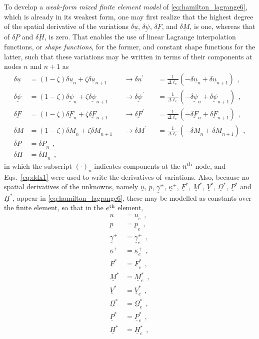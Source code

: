 \documentclass[12pt,a4paper,oneside,english]{abntex2} %
\newcommand{\vect}[1]{\underline{#1}}
\def\lp{\left(}
\def\rp{\right)}
\def\u{\vect{u}}
\def\uprime{\u^{\prime}}
\def\gam{\vect{\gamma}}
\def\gamp{\gam^{+}}
\def\kap{\vect{\kappa}}
\def\kapp{\kap^{+}}
\def\V{\vect{V}}
\def\Vs{\V^{*}}
\def\Om{\vect{\Omega}}
\def\Oms{\Om^{*}}
\def\P{\vect{P}}
\def\Ps{\P^*}
\def\Hv{\vect{H}}
\def\Hvs{\Hv^*}
\def\p{\vect{p}}
\def\F{\vect{F}}
\def\Fs{\F^*}
\def\M{\vect{M}}
\def\Ms{\M^*}
\def\delF{\vect{\delta F}}
\def\delFp{\delF^{\prime}}
\def\delM{\vect{\delta M}}
\def\delMp{\delM^{\prime}}
\def\delP{\vect{\delta P}}
\def\delH{\vect{\delta H}}
\def\delpsi{\vect{\delta\psi}}
\def\delpsip{\delpsi^{\prime}}
\def\Deltal{\Delta \ell_e}
\def\Deltalinv{\frac{1}{\Deltal}}
\def\ue{\u_e}
\def\pe{\p_e}
\def\Vse{\Vs_e}
\def\Omse{\Oms_e}
\def\gampe{\gamp_e}
\def\kappe{\kapp_e}
\def\Fse{\Fs_e}
\def\Mse{\Ms_e}
\def\Pse{\Ps_e}
\def\Hse{\Hvs_e}
\begin{document}
To develop a \textit{weak-form mixed finite element model} \cite{reddy2002energy} of \cref{eq:hamilton_lagrange6}, which is already in its weakest form, one may first realize that the highest degree of the spatial derivative of the variations $\delta\u$, $\delpsi$, $\delF$, and $\delM$, is one, whereas that of $\delP$ and $\delH$, is zero. That enables the use of linear Lagrange interpolation functions, or \textit{shape functions}, for the former, and constant shape functions for the latter, such that these variations may be written in terms of their components at nodes $n$ and $n+1$ as
\begin{equation}
    \begin{alignedat}{3}
        \delta\u &= \lp1-\zeta\rp\delta\u_{n} + \zeta\delta\u_{n+1} 
        &&\rightarrow 
        \delta\uprime &&= \Deltalinv\lp-\delta\u_n+\delta\u_{n+1}\rp \ \ ,
        \\
        \delpsi &= \lp1-\zeta\rp\delpsi_{n} +        \zeta\delpsi_{n+1} 
        &&\rightarrow 
        \delpsip &&= \Deltalinv\lp-\delpsi_n+\delpsi_{n+1}\rp \ \ ,
        \\
        \delF &= \lp1-\zeta\rp\delF_{n} +            \zeta\delF_{n+1} 
        &&\rightarrow 
        \delFp &&= \Deltalinv\lp-\delF_n+\delF_{n+1}\rp \ \ ,
        \\
        \delM &= \lp1-\zeta\rp\delM_{n} +            \zeta\delM_{n+1} 
        &&\rightarrow 
        \delMp &&= \Deltalinv\lp-\delM_n+\delM_{n+1}\rp \ \ ,
        \\
        \delP &= \delP_{n} \ \ ,
        \\
        \delH &= \delH_{n} \ \ ,
        \label{eq:delvars_n_np1}
    \end{alignedat}
\end{equation}
in which the subscript $\lp\cdot\rp_{n}$ indicates components at the $n^{\textnormal{th}}$ node, and Eqs.~\eqref{eq:ddx1} were used to write the derivatives of variations. Also, because no spatial derivatives of the unknowns, namely $\u$, $\p$, $\gamp$, $\kapp$, $\Fs$, $\Ms$, $\Vs$, $\Oms$, $\Ps$ and $\Hvs$, appear in \cref{eq:hamilton_lagrange6}, these may be modelled as constants over the finite element, so that in the $e^{\textnormal{th}}$ element,
\begin{equation}
    \begin{aligned}
        \u &= \ue \ \ , \\
        \p &= \pe \ \ , \\
        \gamp &= \gampe \ \ , \\
        \kapp &= \kappe \ \ , \\
        \Fs &= \Fse \ \ , \\
        \Ms &= \Mse \ \ , \\
        \Vs &= \Vse \ \ , \\
        \Oms &= \Omse \ \ , \\
        \Ps &= \Pse \ \ , \\
        \Hvs &= \Hse \ \ ,
        \label{eq:vars_e}
    \end{aligned}
\end{equation}
\end{document}
